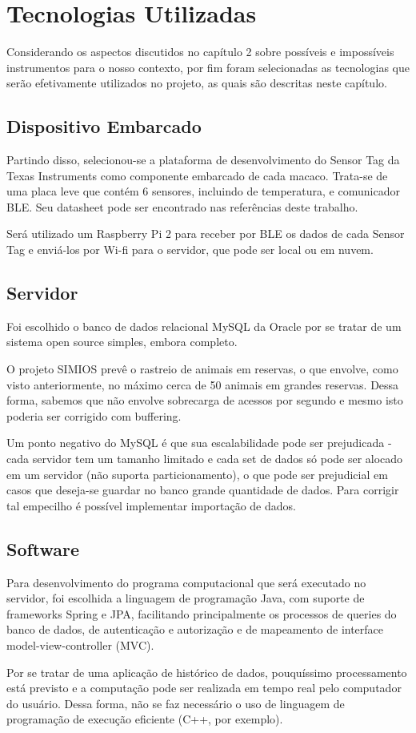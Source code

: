 \chapter{Tecnologias Utilizadas}
Considerando os aspectos discutidos no capítulo 2 sobre possíveis e impossíveis instrumentos para o nosso contexto, por fim foram selecionadas as tecnologias que serão efetivamente utilizados no projeto, as quais são descritas neste capítulo.

\section{Dispositivo Embarcado}
Partindo disso, selecionou-se a plataforma de desenvolvimento do Sensor Tag da Texas Instruments como componente embarcado de cada macaco. Trata-se de uma placa leve que contém 6 sensores, incluindo de temperatura, e comunicador BLE. Seu datasheet pode ser encontrado nas referências deste trabalho.

Será utilizado um Raspberry Pi 2 para receber por BLE os dados de cada Sensor Tag e enviá-los por Wi-fi para o servidor, que pode ser local ou em nuvem. 

\section{Servidor}
Foi escolhido o banco de dados relacional MySQL da Oracle por se tratar de um sistema open source simples, embora completo.

O projeto SIMIOS prevê o rastreio de animais em reservas, o que envolve, como visto anteriormente, no máximo cerca de 50 animais em grandes reservas. Dessa forma, sabemos que não envolve sobrecarga de acessos por segundo e mesmo isto poderia ser corrigido com buffering.

Um ponto negativo do MySQL é que sua escalabilidade pode ser prejudicada - cada servidor tem um tamanho limitado e cada set de dados só pode ser alocado em um servidor (não suporta particionamento), o que pode ser prejudicial em casos que deseja-se guardar no banco grande quantidade de dados. Para corrigir tal empecilho é possível implementar importação de dados.

\section{Software}
Para desenvolvimento do programa computacional que será executado no servidor, foi escolhida a linguagem de programação Java, com suporte de frameworks Spring e JPA, facilitando principalmente os processos de queries do banco de dados, de autenticação e autorização e de mapeamento de interface model-view-controller (MVC).

Por se tratar de uma aplicação de histórico de dados, pouquíssimo processamento está previsto e a computação pode ser realizada em tempo real pelo computador do usuário. Dessa forma, não se faz necessário o uso de linguagem de programação de execução eficiente (C++, por exemplo).
